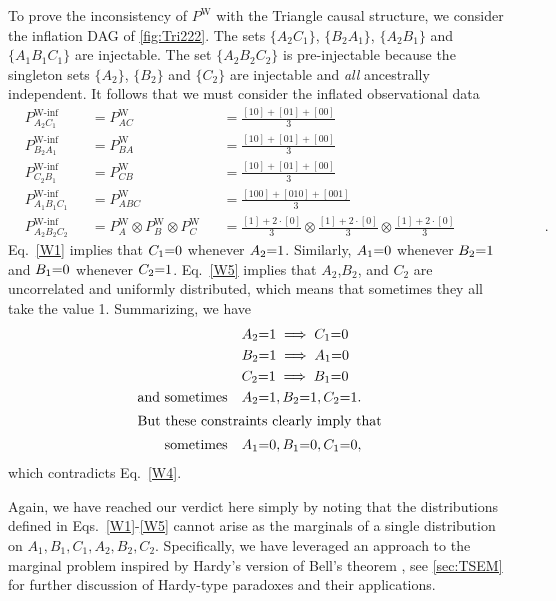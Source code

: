 To prove the inconsistency of  $P^{\text{W}}$ with the Triangle causal structure, we consider the inflation DAG of \cref{fig:Tri222}. 
The sets $\{A_2 C_1\}$, $\{B_2 A_1\}$, $\{A_2 B_1\}$ and $\{ A_1 B_1 C_1\}$ are injectable.  The set $\{ A_2 B_2 C_2\}$ is pre-injectable because the singleton sets $\{A_2\}$,  $\{B_2\}$ and $\{C_2\}$ are injectable and \emph{all} ancestrally independent. It follows that we must consider the inflated observational data
\begin{align}
&P^{\text{W-inf}}_{A_2 C_1}&&=P^{\text{W}}_{A C} &&= \frac{[10]+[01]+[00]}{3} &&&&&&&&\label{W1}\\
&P^{\text{W-inf}}_{B_2 A_1}&&=P^{\text{W}}_{B A} &&= \frac{[10]+[01]+[00]}{3} &&&&&&&&\label{W2}\\
&P^{\text{W-inf}}_{C_2 B_1}&&=P^{\text{W}}_{C B} &&= \frac{[10]+[01]+[00]}{3} &&&&&&&&\label{W3}\\
&P^{\text{W-inf}}_{A_1 B_1 C_1}&&=P^{\text{W}}_{A B C}  &&= \frac{[100]+[010]+[001]}{3} &&&&&&&&\label{W4}\\
&P^{\text{W-inf}}_{A_2 B_2 C_2}&&=P^{\text{W}}_{A}\otimes P^{\text{W}}_{B}\otimes P^{\text{W}}_{C} &&= \frac{[1]+2\cdot[0]}{3}\otimes\frac{[1]+2\cdot[0]}{3}\otimes\frac{[1]+2\cdot[0]}{3} &&&&&&&&\label{W5}.
\end{align}
Eq.~\eqref{W1} %
implies that $C_1\mathord{=} 0$ whenever $A_2 \mathord{=} 1$. Similarly, $A_1\mathord{=} 0$ whenever $B_2\mathord{=} 1$ and $B_1\mathord{=} 0$ whenever $C_2\mathord{=} 1$. Eq.~\eqref{W5} %
implies that $A_2$,$B_2$, and $C_2$ are uncorrelated and uniformly distributed, which means that sometimes they all take the value 1. 
Summarizing, we have
\begin{align*} 
&A_2 \mathord{=} 1 \implies C_1\mathord{=} 0\\
&B_2\mathord{=} 1 \implies A_1\mathord{=} 0\\
&C_2 \mathord{=} 1 \implies B_1 \mathord{=} 0\\
\text{and sometimes}
 \quad &A_2 \mathord{=} 1, B_2 \mathord{=} 1, C_2 \mathord{=} 1.
\\
\shortintertext{But these constraints clearly imply that}
\text{sometimes} \quad &A_1 \mathord{=} 0, B_1 \mathord{=} 0, C_1 \mathord{=} 0,
\end{align*}
which contradicts Eq.~\eqref{W4}.%

Again, we have reached our verdict here simply by noting that the distributions defined in Eqs.~\eqref{W1}-\eqref{W5} cannot arise as the marginals of a single distribution on $A_1, B_1, C_1, A_2, B_2, C_2$.  Specifically, we have leveraged an approach to the marginal problem inspired by Hardy's version of Bell's theorem \cite{L.Hardy:PRL:1665,Mansfield2012}, see \cref{sec:TSEM} for further discussion of Hardy-type paradoxes and their applications.



